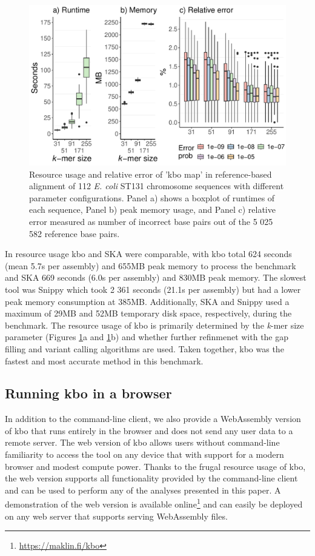\documentclass[unnumsec,webpdf,contemporary,large]{oup-authoring-template}%
\theoremstyle{thmstyleone}%
\theoremstyle{thmstyletwo}%
\theoremstyle{thmstylethree}%
\newcommand{\kbo}{{\sf kbo}}
\begin{document}
\begin{figure}
    \centering
    \includegraphics[width=1.0\linewidth]{kbo_parameter_comparison.pdf}
    \caption{Resource usage and relative error of 'kbo map' in reference-based alignment of 112 \textit{E. coli} ST131 chromosome sequences with different parameter configurations. Panel a) shows a boxplot of runtimes of each sequence, Panel b) peak memory usage, and Panel c) relative error measured as number of incorrect base pairs out of the 5 025 582 reference base pairs.}
    \label{fig:map-by-kmer-size}
\end{figure}


In resource usage {\sf kbo} and SKA were comparable, with {\sf kbo} total 624 seconds (mean 5.7s per assembly) and 655MB peak memory to process the benchmark and SKA 669 seconds (6.0s per assembly) and 830MB peak memory. The slowest tool was Snippy which took 2 361 seconds (21.1s per assembly) but had a lower peak memory consumption at 385MB. Additionally, SKA and Snippy used a maximum of 29MB and 52MB temporary disk space, respectively, during the benchmark. The resource usage of {\sf kbo} is primarily determined by the \emph{k}-mer size parameter (Figures \ref{fig:map-by-kmer-size}a and \ref{fig:map-by-kmer-size}b) and whether further refinmenet with the gap filling and variant calling algorithms are used. Taken together, {\sf kbo} was the fastest and most accurate method in this benchmark.

\subsection{Running {\kbo} in a browser}
In addition to the command-line client, we also provide a WebAssembly version of {\sf kbo} that runs entirely in the browser and does not send any user data to a remote server. The web version of {\sf kbo} allows users without command-line familiarity to access the tool on any device that with support for a modern browser and modest compute power. Thanks to the frugal resource usage of {\sf kbo}, the web version supports all functionality provided by the command-line client and can be used to perform any of the analyses presented in this paper. A demonstration of the web version is available online\footnote{\url{https://maklin.fi/kbo}} and can easily be deployed on any web server that supports serving WebAssembly files.
\end{document}
